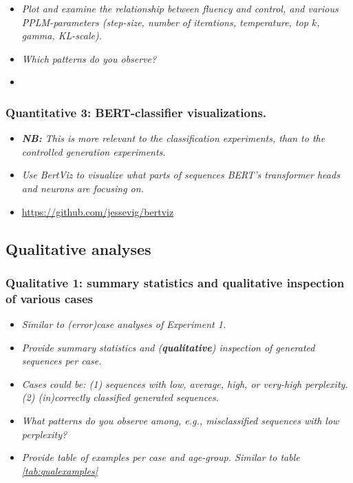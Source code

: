 \begin{itemize}
    \item \textit{Plot and examine the relationship between fluency and control, and various PPLM-parameters (step-size, number of iterations, temperature, top $k$, gamma, KL-scale).}
    \item \textit{Which patterns do you observe?}
    \item {}
\end{itemize}

\subsubsection{Quantitative 3: BERT-classifier visualizations.}

\begin{itemize}
    \item \textit{\textbf{NB:} This is more relevant to the classification experiments, than to the controlled generation experiments.}
    
    \item \textit{Use BertViz to visualize what parts of sequences BERT's transformer heads and neurons are focusing on.}
    
    \item \url{https://github.com/jessevig/bertviz}
\end{itemize}




\subsection{Qualitative analyses}

\subsubsection{Qualitative 1: summary statistics and qualitative inspection of various cases}

\begin{itemize}
    \item \textit{Similar to (error)case analyses of Experiment 1.}
    
    \item \textit{Provide summary statistics and (\textbf{qualitative}) inspection of generated sequences per case.}
    
    \item \textit{Cases could be: (1) sequences with low, average, high, or very-high perplexity. (2) (in)correctly classified generated sequences.}
    
    \item \textit{What patterns do you observe among, e.g., misclassified sequences with low perplexity?}
    
    \item \textit{Provide table of examples per case and age-group. Similar to table \ref{tab:qualexamples}}
\end{itemize}


